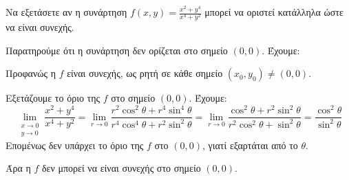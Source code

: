 \documentclass[a4paper,11pt]{report}
\begin{document}
\begin{example}
  Να εξετάσετε αν η συνάρτηση $ f(x,y) = \frac{x^{2}+y^{4}}{x^{4}+y^{2}} $ μπορεί να 
  οριστεί κατάλληλα ώστε να είναι συνεχής.
  \begin{solution}
    Παρατηρούμε ότι η συνάρτηση δεν ορίζεται στο σημείο $ (0,0) $. Έχουμε:
    \begin{myitemize}
      \item Προφανώς η $f$ είναι συνεχής, ως ρητή σε κάθε σημείο 
        $ (x_{0}, y_{0}) \neq (0,0) $.  
      \item Εξετάζουμε το όριο της $f$ στο σημείο $ (0,0) $. Έχουμε:
        \[
          \lim\limits_{\substack{x\to 0 \\y \to 0}} \frac{x^{2}+y^{4}}{x^{4}+y^{2}} =
          \lim_{r \to 0} \frac{r^{2} \cos^{2}{\theta} + r^{4} 
          \sin^{4}{\theta}}{r^{4} \cos^{4}{\theta} + r^{2} \sin^{2}{\theta}} =
          \lim_{r \to 0} \frac{\cos^{2}{\theta} + r^{2} \sin^{2}{\theta}}{r^{2}
          \cos^{2}{\theta} + \sin^{2}{\theta}} =
          \frac{\cos^{2}{\theta}}{\sin^{2}{\theta}}
        \] 
        Επομένως δεν υπάρχει το όριο της $f$ στο $ (0,0) $, γιατί εξαρτάται από το
        $\theta$. 
    \end{myitemize}
    Άρα η $f$ δεν μπορεί να είναι συνεχής στο σημείο $(0,0)$.
  \end{solution}
\end{example}
\end{document}
